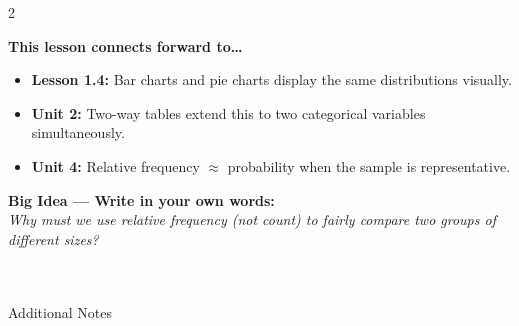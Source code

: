 \documentclass[10pt]{article}
\begin{document}
\begin{spiralbox}
\small
\begin{multicols}{2}

\textbf{This lesson connects forward to\dots}
\begin{itemize}[itemsep=2pt]
  \item \textbf{Lesson 1.4:} Bar charts and pie charts display the same distributions visually.
  \item \textbf{Unit 2:} Two-way tables extend this to two categorical variables simultaneously.
  \item \textbf{Unit 4:} Relative frequency $\approx$ probability when the sample is representative.
\end{itemize}

\columnbreak

\textbf{Big Idea --- Write in your own words:}\\
\textit{Why must we use relative frequency (not count) to fairly compare
two groups of different sizes?}\\[2pt]
\writeline\\[1pt]\writeline\\[1pt]\writeline

\end{multicols}
\end{spiralbox}

\vspace{0.1in}

\begin{notesbox}{Additional Notes}
\vspace{0pt}
\writeline\\\writeline\\\writeline\\\writeline\\\writeline\\\writeline
\end{notesbox}
\end{document}
